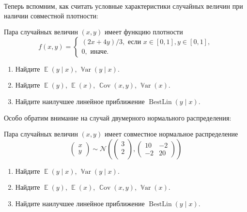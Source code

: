 \documentclass[12pt]{article}
\DeclareMathOperator{\Cov}{\mathbb{C}ov}
\DeclareMathOperator{\Var}{\mathbb{V}ar}
\DeclareMathOperator{\BestLin}{BestLin}
\DeclareMathOperator{\E}{\mathbb{E}}
\newcommand{\cN}{\mathcal{N}}
\newenvironment{sol}{}{}
\begin{document}
Теперь вспомним, как считать условные характеристики случайных величин при наличии совместной плотности:
\begin{problem}
Пара случайных величин $(x, y)$ имеет функцию плотности
\[
f(x, y) = \begin{cases}
(2x + 4y)/3, \text{ если } x\in [0, 1], y\in [0, 1], \\
0, \text{ иначе.}
\end{cases}
\]

\begin{enumerate}
    \item Найдите $\E(y \mid x)$, $\Var(y \mid x)$.
    \item Найдите $\E(y)$, $\E(x)$, $\Cov(x, y)$, $\Var(x)$.
    \item Найдите наилучшее линейное приближение $\BestLin(y \mid x)$.
\end{enumerate}

    \begin{sol}
    \end{sol}
\end{problem}


Особо обратим внимание на случай двумерного нормального распределения:
\begin{problem}
Пара случайных величин $(x, y)$ имеет совместное нормальное распределение
\[
\begin{pmatrix}
    x \\
    y 
\end{pmatrix} \sim \cN\left(\begin{pmatrix}
    3 \\
    2 \\
\end{pmatrix}, 
\begin{pmatrix}
    10 & -2 \\
    -2 & 20
\end{pmatrix}\right)
\]

\begin{enumerate}
    \item Найдите $\E(y \mid x)$, $\Var(y \mid x)$.
    \item Найдите $\E(y)$, $\E(x)$, $\Cov(x, y)$, $\Var(x)$.
    \item Найдите наилучшее линейное приближение $\BestLin(y \mid x)$.
\end{enumerate}

    \begin{sol}
    \end{sol}
\end{problem}
\end{document}
